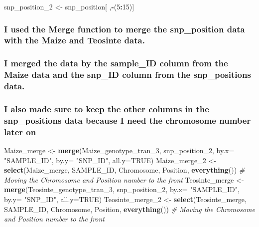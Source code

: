 \documentclass[
]{article}
\newenvironment{Shaded}{\begin{snugshade}}{\end{snugshade}}
\newcommand{\AttributeTok}[1]{\textcolor[rgb]{0.13,0.29,0.53}{#1}}
\newcommand{\CommentTok}[1]{\textcolor[rgb]{0.56,0.35,0.01}{\textit{#1}}}
\newcommand{\ConstantTok}[1]{\textcolor[rgb]{0.56,0.35,0.01}{#1}}
\newcommand{\DecValTok}[1]{\textcolor[rgb]{0.00,0.00,0.81}{#1}}
\newcommand{\FunctionTok}[1]{\textcolor[rgb]{0.13,0.29,0.53}{\textbf{#1}}}
\newcommand{\NormalTok}[1]{#1}
\newcommand{\OtherTok}[1]{\textcolor[rgb]{0.56,0.35,0.01}{#1}}
\newcommand{\SpecialCharTok}[1]{\textcolor[rgb]{0.81,0.36,0.00}{\textbf{#1}}}
\newcommand{\StringTok}[1]{\textcolor[rgb]{0.31,0.60,0.02}{#1}}
\begin{document}
\begin{Shaded}
\begin{Highlighting}[]
\NormalTok{snp\_position\_2 }\OtherTok{\textless{}{-}}\NormalTok{ snp\_position[ ,}\SpecialCharTok{{-}}\NormalTok{(}\DecValTok{5}\SpecialCharTok{:}\DecValTok{15}\NormalTok{)]}
\end{Highlighting}
\end{Shaded}

\subsubsection{I used the Merge function to merge the snp\_position data
with the Maize and Teosinte
data.}\label{i-used-the-merge-function-to-merge-the-snp_position-data-with-the-maize-and-teosinte-data.}

\subsubsection{I merged the data by the sample\_ID column from the Maize
data and the snp\_ID column from the snp\_positions
data.}\label{i-merged-the-data-by-the-sample_id-column-from-the-maize-data-and-the-snp_id-column-from-the-snp_positions-data.}

\subsubsection{I also made sure to keep the other columns in the
snp\_positions data because I need the chromosome number later
on}\label{i-also-made-sure-to-keep-the-other-columns-in-the-snp_positions-data-because-i-need-the-chromosome-number-later-on}

\begin{Shaded}
\begin{Highlighting}[]
\NormalTok{Maize\_merge }\OtherTok{\textless{}{-}} \FunctionTok{merge}\NormalTok{(Maize\_genotype\_tran\_3, snp\_position\_2, }\AttributeTok{by.x=} \StringTok{"SAMPLE\_ID"}\NormalTok{, }\AttributeTok{by.y=} \StringTok{"SNP\_ID"}\NormalTok{, }\AttributeTok{all.y=}\ConstantTok{TRUE}\NormalTok{)}
\NormalTok{Maize\_merge\_2 }\OtherTok{\textless{}{-}} \FunctionTok{select}\NormalTok{(Maize\_merge, SAMPLE\_ID, Chromosome, Position, }\FunctionTok{everything}\NormalTok{()) }\CommentTok{\# Moving the Chromosome and Position number to the front}
\NormalTok{Teosinte\_merge }\OtherTok{\textless{}{-}} \FunctionTok{merge}\NormalTok{(Teosinte\_genotype\_tran\_3, snp\_position\_2, }\AttributeTok{by.x=} \StringTok{"SAMPLE\_ID"}\NormalTok{, }\AttributeTok{by.y=} \StringTok{"SNP\_ID"}\NormalTok{, }\AttributeTok{all.y=}\ConstantTok{TRUE}\NormalTok{)}
\NormalTok{Teosinte\_merge\_2 }\OtherTok{\textless{}{-}} \FunctionTok{select}\NormalTok{(Teosinte\_merge, SAMPLE\_ID, Chromosome, Position, }\FunctionTok{everything}\NormalTok{()) }\CommentTok{\# Moving the Chromosome and Position number to the front}
\end{Highlighting}
\end{Shaded}
\end{document}
